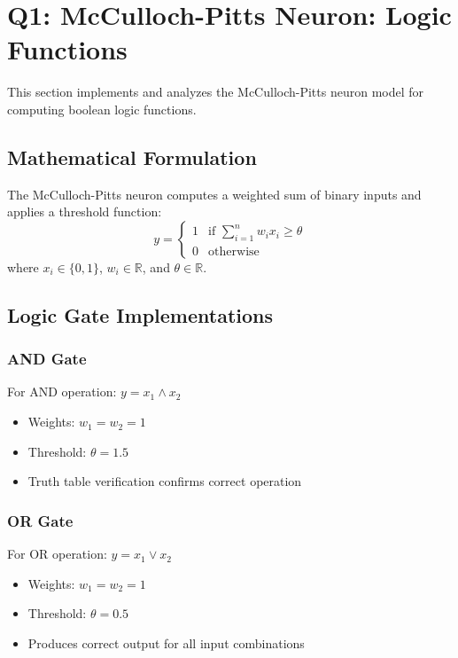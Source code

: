 \documentclass[conference]{IEEEtran}
\begin{document}
\section{Q1: McCulloch-Pitts Neuron: Logic Functions}\label{sec:q1}
This section implements and analyzes the McCulloch-Pitts neuron model for computing boolean logic functions.

\subsection{Mathematical Formulation}
The McCulloch-Pitts neuron computes a weighted sum of binary inputs and applies a threshold function:
\begin{equation}
y = \begin{cases}
1 & \text{if } \sum_{i=1}^{n} w_i x_i \geq \theta \\
0 & \text{otherwise}
\end{cases}
\end{equation}
where $x_i \in \{0,1\}$, $w_i \in \mathbb{R}$, and $\theta \in \mathbb{R}$.

\subsection{Logic Gate Implementations}

\subsubsection{AND Gate}
For AND operation: $y = x_1 \land x_2$
\begin{itemize}
    \item Weights: $w_1 = w_2 = 1$
    \item Threshold: $\theta = 1.5$
    \item Truth table verification confirms correct operation
\end{itemize}

\subsubsection{OR Gate}
For OR operation: $y = x_1 \lor x_2$
\begin{itemize}
    \item Weights: $w_1 = w_2 = 1$
    \item Threshold: $\theta = 0.5$
    \item Produces correct output for all input combinations
\end{itemize}
\end{document}
